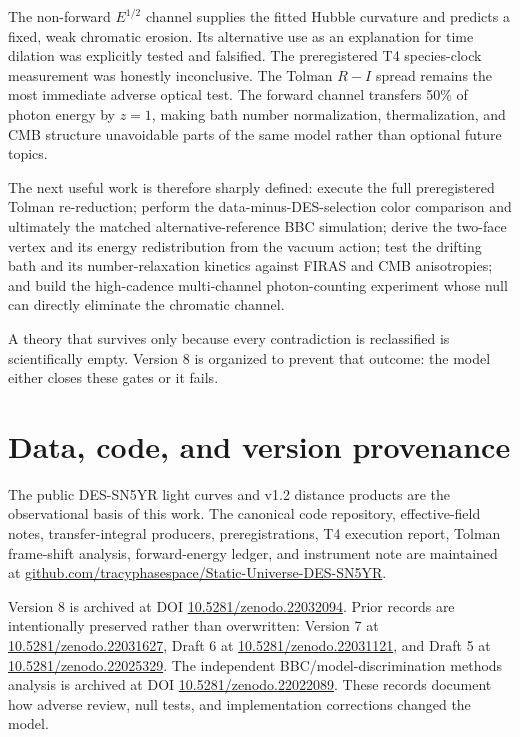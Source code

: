 \documentclass[11pt]{article}
\newcommand{\methodsdoi}{10.5281/zenodo.22022089}
\newcommand{\draftfivedoi}{10.5281/zenodo.22025329}
\newcommand{\draftsixdoi}{10.5281/zenodo.22031121}
\newcommand{\vsevendoi}{10.5281/zenodo.22031627}
\newcommand{\veightdoi}{10.5281/zenodo.22032094}
\begin{document}
The non-forward $E^{1/2}$ channel supplies the fitted Hubble curvature and predicts a fixed, weak chromatic erosion. Its alternative use as an explanation for time dilation was explicitly tested and falsified. The preregistered T4 species-clock measurement was honestly inconclusive. The Tolman $R-I$ spread remains the most immediate adverse optical test. The forward channel transfers 50\% of photon energy by $z=1$, making bath number normalization, thermalization, and CMB structure unavoidable parts of the same model rather than optional future topics.

The next useful work is therefore sharply defined: execute the full preregistered Tolman re-reduction; perform the data-minus-DES-selection color comparison and ultimately the matched alternative-reference BBC simulation; derive the two-face vertex and its energy redistribution from the vacuum action; test the drifting bath and its number-relaxation kinetics against FIRAS and CMB anisotropies; and build the high-cadence multi-channel photon-counting experiment whose null can directly eliminate the chromatic channel.

A theory that survives only because every contradiction is reclassified is scientifically empty. Version 8 is organized to prevent that outcome: the model either closes these gates or it fails.

\section*{Data, code, and version provenance}
The public DES-SN5YR light curves and v1.2 distance products are the observational basis of this work. The canonical code repository, effective-field notes, transfer-integral producers, preregistrations, T4 execution report, Tolman frame-shift analysis, forward-energy ledger, and instrument note are maintained at \href{https://github.com/tracyphasespace/Static-Universe-DES-SN5YR}{github.com/tracyphasespace/Static-Universe-DES-SN5YR}.

Version 8 is archived at DOI \href{https://doi.org/\veightdoi}{\veightdoi}. Prior records are intentionally preserved rather than overwritten: Version 7 at \href{https://doi.org/\vsevendoi}{\vsevendoi}, Draft 6 at \href{https://doi.org/\draftsixdoi}{\draftsixdoi}, and Draft 5 at \href{https://doi.org/\draftfivedoi}{\draftfivedoi}. The independent BBC/model-discrimination methods analysis is archived at DOI \href{https://doi.org/\methodsdoi}{\methodsdoi}. These records document how adverse review, null tests, and implementation corrections changed the model.
\end{document}

